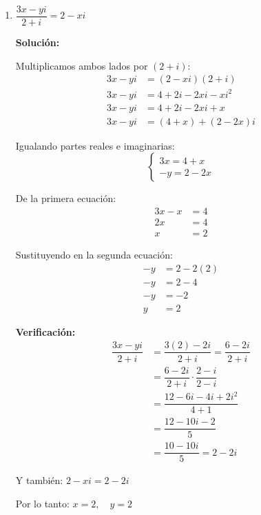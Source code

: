 \documentclass[12pt]{article}
\newcommand{\solucion}{%
    \vspace{0.8em}%
    \textbf{Solución:}%
}
\begin{document}
\begin{enumerate}[label=\alph*.-]
    Por lo tanto: $\boxed{x = -\dfrac{1}{2}, \quad y = 4}$

    \item $\dfrac{3x - yi}{2 + i} = 2 - xi$

    \solucion

    Multiplicamos ambos lados por $(2 + i)$:
    \begin{align*}
    3x - yi &= (2 - xi)(2 + i) \\[0.3em]
    3x - yi &= 4 + 2i - 2xi - xi^2 \\[0.3em]
    3x - yi &= 4 + 2i - 2xi + x \\[0.3em]
    3x - yi &= (4 + x) + (2 - 2x)i
    \end{align*}

    Igualando partes reales e imaginarias:
    \[
    \begin{cases}
    3x = 4 + x \\
    -y = 2 - 2x
    \end{cases}
    \]

    De la primera ecuación:
    \begin{align*}
    3x - x &= 4 \\[0.3em]
    2x &= 4 \\[0.3em]
    x &= 2
    \end{align*}

    Sustituyendo en la segunda ecuación:
    \begin{align*}
    -y &= 2 - 2(2) \\[0.3em]
    -y &= 2 - 4 \\[0.3em]
    -y &= -2 \\[0.3em]
    y &= 2
    \end{align*}

    \textbf{Verificación:}
    \begin{align*}
    \dfrac{3x - yi}{2 + i} &= \dfrac{3(2) - 2i}{2 + i} = \dfrac{6 - 2i}{2 + i} \\[0.3em]
    &= \dfrac{6 - 2i}{2 + i} \cdot \dfrac{2 - i}{2 - i} \\[0.3em]
    &= \dfrac{12 - 6i - 4i + 2i^2}{4 + 1} \\[0.3em]
    &= \dfrac{12 - 10i - 2}{5} \\[0.3em]
    &= \dfrac{10 - 10i}{5} = 2 - 2i
    \end{align*}
    
    Y también: $2 - xi = 2 - 2i$ \checkmark

    Por lo tanto: $\boxed{x = 2, \quad y = 2}$


\end{enumerate}
\end{document}
